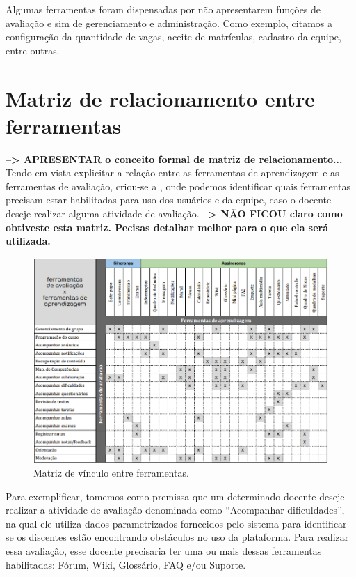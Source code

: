 Algumas ferramentas foram dispensadas por não apresentarem funções de avaliação e sim de gerenciamento e administração. Como exemplo, citamos a configuração da quantidade de vagas, aceite de matrículas, cadastro da equipe, entre outras.

\section{Matriz de relacionamento entre ferramentas}
\textbf{--> APRESENTAR o conceito formal de matriz de relacionamento...}
Tendo em vista explicitar a relação entre as ferramentas de aprendizagem e as ferramentas de avaliação, criou-se a , onde podemos identificar quais ferramentas precisam estar habilitadas para uso dos usuários e da equipe, caso o docente deseje realizar alguma atividade de avaliação.
\textbf{--> NÃO FICOU claro como obtiveste esta matriz. Pecisas detalhar melhor para o que ela será utilizada.}


    \begin{figure}[h]
        \centering
            \includegraphics[width=\textwidth]{img/ferramentas_avaliacao.png}
        \caption{Matriz de vínculo entre ferramentas.}
        \label{fig:ferramentas}
    \end{figure}

Para exemplificar, tomemos como premissa que um determinado docente deseje realizar a atividade de avaliação denominada como ``Acompanhar dificuldades'', na qual ele utiliza dados parametrizados fornecidos pelo sistema para identificar se os discentes estão encontrando obstáculos no uso da plataforma. Para realizar essa avaliação, esse docente precisaria ter uma ou mais dessas ferramentas habilitadas: Fórum, Wiki, Glossário, FAQ e/ou Suporte.

